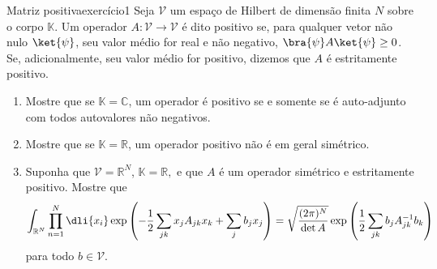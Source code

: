 \begin{exercício}{Matriz positiva}{exercício1}
    Seja \(\mathscr{V}\) um espaço de Hilbert de dimensão finita \(N\) sobre o corpo \(\mathbb{K}\). Um operador \(A : \mathscr{V} \to \mathscr{V}\) é dito positivo se, para qualquer vetor não nulo \(\ket{\psi}\), seu valor médio for real e não negativo, \(\bra{\psi}A\ket{\psi} \geq 0\). Se, adicionalmente, seu valor médio for positivo, dizemos que \(A\) é estritamente positivo.
    \begin{enumerate}[label=(\alph*)]
        \item Mostre que se \(\mathbb{K} = \mathbb{C}\), um operador é positivo se e somente se é auto-adjunto com todos autovalores não negativos.
        \item Mostre que se \(\mathbb{K} = \mathbb{R}\), um operador positivo não é em geral simétrico.
        \item Suponha que \(\mathscr{V} = \mathbb{R}^N\), \(\mathbb{K} = \mathbb{R},\) e que \(A\) é um operador simétrico e estritamente positivo. Mostre que
            \begin{equation*}
                \int_{\mathbb{R}^N} \prod_{n = 1}^N \dli{x_i}\exp\left(-\frac12 \sum_{jk} x_j A_{jk} x_k + \sum_{j} b_j x_j\right) = \sqrt{\frac{(2\pi)^N}{\det{A}}}\exp\left(\frac12 \sum_{jk}b_j A^{-1}_{jk}b_k\right)
            \end{equation*}
            para todo \(b \in \mathscr{V}.\)
    \end{enumerate}
\end{exercício}
